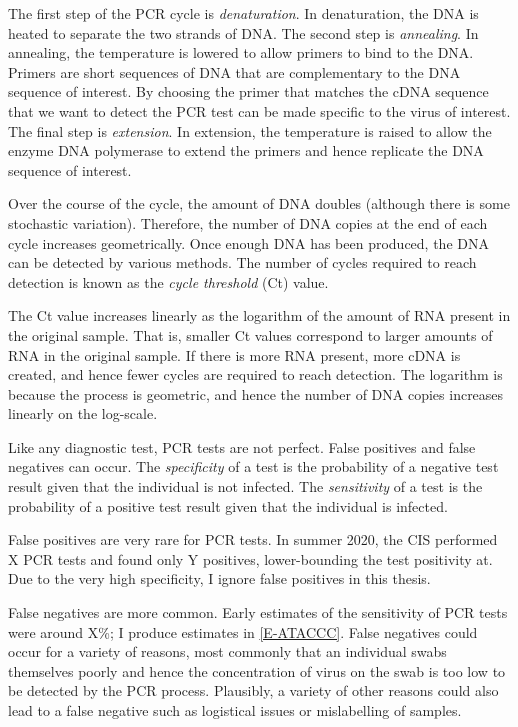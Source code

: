 \documentclass[thesis.tex]{subfiles}
\begin{document}
The first step of the PCR cycle is \emph{denaturation}.
In denaturation, the DNA is heated to separate the two strands of DNA.
The second step is \emph{annealing}.
In annealing, the temperature is lowered to allow primers to bind to the DNA.
Primers are short sequences of DNA that are complementary to the DNA sequence of interest.
By choosing the primer that matches the cDNA sequence that we want to detect the PCR test can be made specific to the virus of interest.
The final step is \emph{extension}.
In extension, the temperature is raised to allow the enzyme DNA polymerase to extend the primers and hence replicate the DNA sequence of interest.

Over the course of the cycle, the amount of DNA doubles (although there is some stochastic variation).
Therefore, the number of DNA copies at the end of each cycle increases geometrically.
Once enough DNA has been produced, the DNA can be detected by various methods.
The number of cycles required to reach detection is known as the \emph{cycle threshold} (Ct) value.

The Ct value increases linearly as the logarithm of the amount of RNA present in the original sample.
That is, smaller Ct values correspond to larger amounts of RNA in the original sample.
If there is more RNA present, more cDNA is created, and hence fewer cycles are required to reach detection.
The logarithm is because the process is geometric, and hence the number of DNA copies increases linearly on the log-scale.

Like any diagnostic test, PCR tests are not perfect.
False positives and false negatives can occur.
The \emph{specificity} of a test is the probability of a negative test result given that the individual is not infected.
The \emph{sensitivity} of a test is the probability of a positive test result given that the individual is infected.

False positives are very rare for PCR tests.
In summer 2020, the CIS performed X PCR tests and found only Y positives, lower-bounding the test positivity at.
Due to the very high specificity, I ignore false positives in this thesis.

False negatives are more common.
Early estimates of the sensitivity of PCR tests were around X\%; I produce estimates in \cref{E-ATACCC}.
False negatives could occur for a variety of reasons, most commonly that an individual swabs themselves poorly and hence the concentration of virus on the swab is too low to be detected by the PCR process.
Plausibly, a variety of other reasons could also lead to a false negative such as logistical issues or mislabelling of samples.
\end{document}
